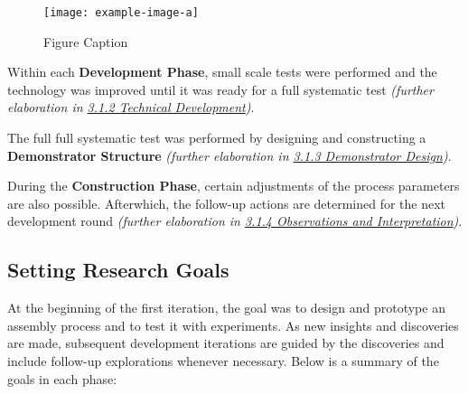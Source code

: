 \begin{figure}
    \centering
    \texttt{[image: example-image-a]}
    \caption{Figure Caption}
\end{figure}

Within each \textbf{Development Phase}, small scale tests were performed and the technology was improved until it was ready for a full systematic test \textit{(further elaboration in \ul{3.1.2 Technical Development})}. 

The full full systematic test was performed by designing and constructing a \textbf{Demonstrator Structure} \textit{(further elaboration in \ul{3.1.3 Demonstrator Design})}. 

During the \textbf{Construction Phase}, certain adjustments of the process parameters are also possible. Afterwhich, the follow-up actions are determined for the next development round\textbf{ }\textit{(further elaboration in \ul{3.1.4 Observations and Interpretation})}.

\subsection{Setting Research Goals}

At the beginning of the first iteration, the goal was to design and prototype an assembly process and to test it with experiments. As new insights and discoveries are made, subsequent development iterations are guided by the discoveries and include follow-up explorations whenever necessary. Below is a summary of the goals in each phase:

